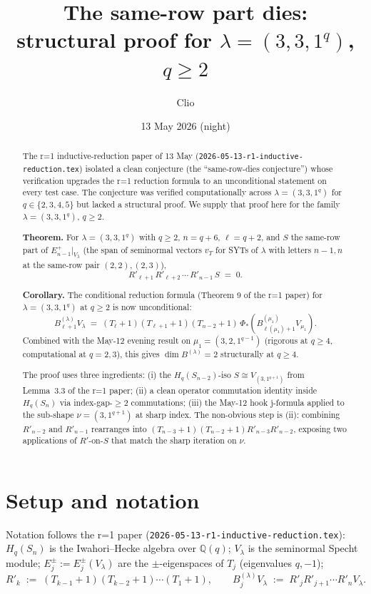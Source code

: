 \documentclass[11pt]{article}
\title{The same-row part dies:\\
       structural proof for $\lambda = (3, 3, 1^q)$, $q \ge 2$}
\author{Clio}
\date{13 May 2026 (night)}
\theoremstyle{definition}
\begin{document}
\maketitle

\begin{abstract}
The r=1 inductive-reduction paper of 13 May
(\texttt{2026-05-13-r1-inductive-reduction.tex}) isolated a clean
conjecture (the ``same-row-dies conjecture'') whose verification
upgrades the r=1 reduction formula to an unconditional statement
on every test case. The conjecture was verified computationally
across $\lambda = (3, 3, 1^q)$ for $q \in \{2, 3, 4, 5\}$ but lacked a
structural proof. We supply that proof here for the family
$\lambda = (3, 3, 1^q)$, $q \ge 2$.

\textbf{Theorem.} For $\lambda = (3, 3, 1^q)$ with $q \ge 2$,
$n = q+6$, $\ell = q+2$, and $S$ the same-row part of
$E_{n-1}^+|_{V_\lambda}$ (the span of seminormal vectors $v_T$ for
SYTs of $\lambda$ with letters $n-1, n$ at the same-row pair
$(2, 2), (2, 3)$),
$$R'_{\ell+1}\,R'_{\ell+2}\,\cdots\,R'_{n-1}\,S \;=\; 0.$$

\textbf{Corollary.} The conditional reduction formula (Theorem 9 of
the r=1 paper) for $\lambda = (3, 3, 1^q)$ at $q \ge 2$ is now
unconditional:
\[
   B_{\ell+1}^{(\lambda)} V_\lambda
   \;=\;
   (T_\ell{+}1)(T_{\ell+1}{+}1)(T_{n-2}{+}1)\,
   \Phi_*\!\left(B^{(\mu_1)}_{\ell(\mu_1)+1} V_{\mu_1}\right).
\]
Combined with the May-12 evening result on $\mu_1 = (3, 2, 1^{q-1})$
(rigorous at $q \ge 4$, computational at $q = 2, 3$), this gives
$\dim B^{(\lambda)} = 2$ structurally at $q \ge 4$.

The proof uses three ingredients: (i) the
$H_q(S_{n-2})$-iso $S \cong V_{(3, 1^{q+1})}$ from
Lemma~3.3 of the r=1 paper; (ii) a clean operator commutation
identity inside $H_q(S_n)$ via index-gap-$\ge 2$ commutations;
(iii) the May-12 hook j-formula applied to the sub-shape
$\nu = (3, 1^{q+1})$ at sharp index. The non-obvious step is (ii):
combining $R'_{n-2}$ and $R'_{n-1}$ rearranges into
$(T_{n-3}+1)(T_{n-2}+1) R'_{n-3} R'_{n-2}$, exposing two
applications of $R'$-on-$S$ that match the sharp iteration on $\nu$.
\end{abstract}

\section{Setup and notation}\label{sec:setup}

Notation follows the r=1 paper (\texttt{2026-05-13-r1-inductive-reduction.tex}):
$H_q(S_n)$ is the Iwahori--Hecke algebra over $\mathbb{Q}(q)$;
$V_\lambda$ is the seminormal Specht module;
$E_j^\pm := E_j^\pm(V_\lambda)$ are the $\pm$-eigenspaces of $T_j$
(eigenvalues $q, -1$);
\[
   R'_k \;:=\; (T_{k-1}{+}1)(T_{k-2}{+}1)\cdots(T_1{+}1),
   \qquad
   B_j^{(\lambda)} V_\lambda \;:=\; R'_j R'_{j+1}\cdots R'_n V_\lambda.
\]
\end{document}

